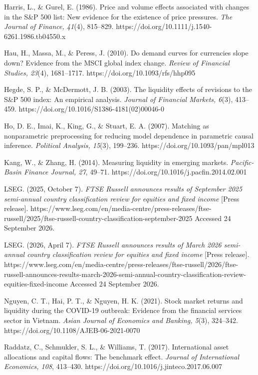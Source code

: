 Harris, L., \& Gurel, E. (1986). Price and volume effects associated
with changes in the S\&P 500 list: New evidence for the existence of
price pressures. \emph{The Journal of Finance, 41}(4), 815--829.
https://doi.org/10.1111/j.1540-6261.1986.tb04550.x

Hau, H., Massa, M., \& Peress, J. (2010). Do demand curves for
currencies slope down? Evidence from the MSCI global index change.
\emph{Review of Financial Studies, 23}(4), 1681--1717.
https://doi.org/10.1093/rfs/hhp095

Hegde, S. P., \& McDermott, J. B. (2003). The liquidity effects of
revisions to the S\&P 500 index: An empirical analysis. \emph{Journal of
Financial Markets, 6}(3), 413--459.
https://doi.org/10.1016/S1386-4181(02)00046-0

Ho, D. E., Imai, K., King, G., \& Stuart, E. A. (2007). Matching as
nonparametric preprocessing for reducing model dependence in parametric
causal inference. \emph{Political Analysis, 15}(3), 199--236.
https://doi.org/10.1093/pan/mpl013

Kang, W., \& Zhang, H. (2014). Measuring liquidity in emerging markets.
\emph{Pacific-Basin Finance Journal, 27}, 49--71.
https://doi.org/10.1016/j.pacfin.2014.02.001

LSEG. (2025, October 7). \emph{FTSE Russell announces results of
September 2025 semi-annual country classification review for equities
and fixed income} {[}Press release{]}.
https://www.lseg.com/en/media-centre/press-releases/ftse-russell/2025/ftse-russell-country-classification-september-2025
Accessed 24 September 2026.

LSEG. (2026, April 7). \emph{FTSE Russell announces results of March
2026 semi-annual country classification review for equities and fixed
income} {[}Press release{]}.
https://www.lseg.com/en/media-centre/press-releases/ftse-russell/2026/ftse-russell-announces-results-march-2026-semi-annual-country-classification-review-equities-fixed-income
Accessed 24 September 2026.

Nguyen, C. T., Hai, P. T., \& Nguyen, H. K. (2021). Stock market returns
and liquidity during the COVID-19 outbreak: Evidence from the financial
services sector in Vietnam. \emph{Asian Journal of Economics and
Banking, 5}(3), 324--342. https://doi.org/10.1108/AJEB-06-2021-0070

Raddatz, C., Schmukler, S. L., \& Williams, T. (2017). International
asset allocations and capital flows: The benchmark effect. \emph{Journal
of International Economics, 108}, 413--430.
https://doi.org/10.1016/j.jinteco.2017.06.007

